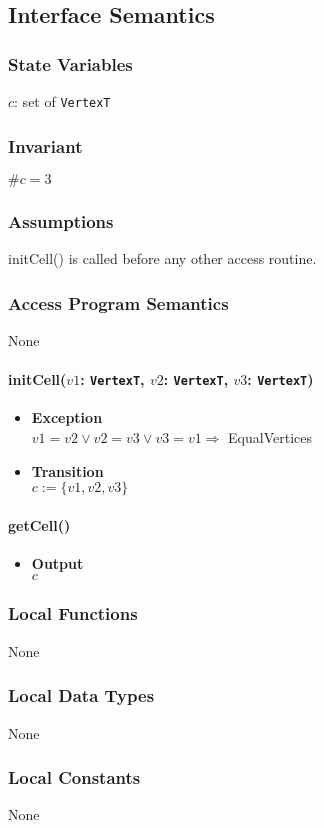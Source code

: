 \documentclass[12pt,titlepage]{article}
\begin{document}
\subsection{Interface Semantics}
\subsubsection{State Variables}
$c$: set of {\tt VertexT}
\subsubsection{Invariant} $\# c = 3$
\subsubsection{Assumptions}initCell() is called before any other access routine.
\subsubsection{Access Program Semantics}None
\paragraph{initCell($v1$: {\tt VertexT}, $v2$: {\tt VertexT}, $v3$: {\tt VertexT})}
\begin{itemize}
\item \textbf{Exception}\\  $v1=v2 \vee v2=v3 \vee v3=v1 \Longrightarrow$ EqualVertices
\item \textbf{Transition}\\ 
$c := \{v1, v2, v3\}$
\end{itemize}

\paragraph{getCell()}
\begin{itemize}
\item \textbf{Output}\\ $c$ 
\end{itemize}

\subsubsection{Local Functions} None
\subsubsection{Local Data Types} None
\subsubsection{Local Constants} None
\end{document}
